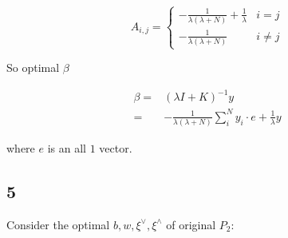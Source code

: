 \documentclass[fleqn,a4paper,12pt]{article}
\begin{document}
\[A_{i,j}  = 
\begin{cases}
  - \frac{1}{\lambda (\lambda + N)} + \frac{1}{\lambda} & i = j \\
  - \frac{1}{\lambda (\lambda + N)} & i \ne j
\end{cases}
\]


So optimal $\beta$

\begin{align*}
  \beta
  =& (\lambda I + K)^{-1} y \\
  =& -\frac{1}{\lambda(\lambda + N)} \sum_i^N y_i \cdot e + \frac{1}{\lambda} y
\end{align*}

where $e$ is an all $1$ vector.


\subsection*{5}

Consider the optimal $b, w, \xi^{\vee}, \xi^{\wedge}$ of original $P_2$:
\end{document}
